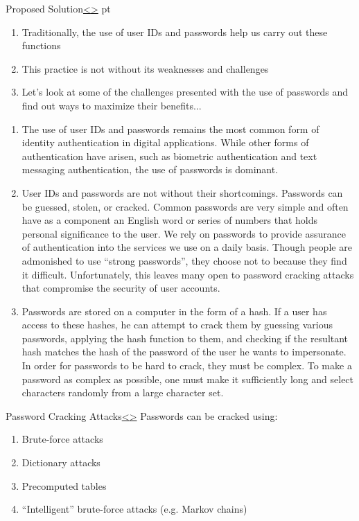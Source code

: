 \documentclass[12pt]{extarticle}
\newenvironment{instructionblock}{\Large\bgroup}{\egroup}
\newcommand{\ben}{\begin{enumerate}}
\newcommand{\een}{\end{enumerate}}
\begin{document}
\pagebreak
\begin{slide}{Proposed Solution}{\hyperref[slide 2]{\textless}\hyperref[slide 4]{\textgreater}}
	 pt
	\begin{instructionblock}
	\ben
	\item Traditionally, the use of user IDs and passwords help us carry out these functions
	\item This practice is not without its weaknesses and challenges
	\item Let's look at some of the challenges presented with the use of passwords and find out ways to maximize their benefits...
	\een
	
	\end{instructionblock}
\end{slide}
\ben
	\item The use of user IDs and passwords remains the most common form of identity authentication in digital applications. While other forms of authentication have arisen, such as biometric authentication and text messaging authentication, the use of passwords is dominant. 
	\item User IDs and passwords are not without their shortcomings. Passwords can be guessed, stolen, or cracked. Common passwords are very simple and often have as a component an English word or series of numbers that holds personal significance to the user. We rely on passwords to provide assurance of authentication into the services we use on a daily basis. Though people are admonished to use ``strong passwords'', they choose not to because they find it difficult. Unfortunately, this leaves many open to password cracking attacks that compromise the security of user accounts. \cite{strongpass}
	\item Passwords are stored on a computer in the form of a hash. If a user has access to these hashes, he can attempt to crack them by guessing various passwords, applying the hash function to them, and checking if the resultant hash matches the hash of the password of the user he wants to impersonate. In order for passwords to be hard to crack, they must be complex. To make a password as complex as possible, one must make it sufficiently long and select characters randomly from a large character set.
\een

\vfill

\pagebreak
\begin{slide}{Password Cracking Attacks}{\hyperref[slide 3]{\textless}\hyperref[slide 5]{\textgreater}}
	\vskip 10pt
	\begin{instructionblock}
		Passwords can be cracked using:
		\begin{enumerate}
			\item Brute-force attacks
			\item Dictionary attacks
			\item Precomputed tables
			\item ``Intelligent'' brute-force attacks (e.g. Markov chains)
		\end{enumerate}
	\end{instructionblock}
\end{slide}
\end{document}
